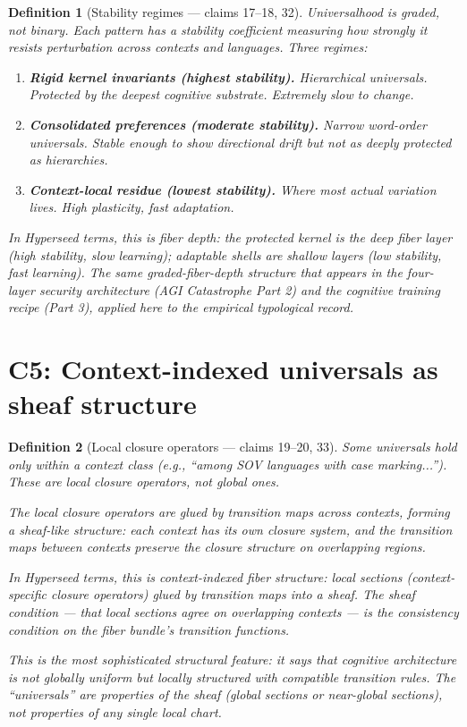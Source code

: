 \documentclass[11pt,a4paper]{article}
\newtheorem{definition}{Definition}[section]
\begin{document}
\begin{definition}[Stability regimes --- claims 17--18, 32]
\label{def:graded}
Universalhood is graded, not binary. Each pattern has a stability
coefficient measuring how strongly it resists perturbation across
contexts and languages. Three regimes:

\begin{enumerate}
\item \textbf{Rigid kernel invariants (highest stability).}
  Hierarchical universals. Protected by the deepest cognitive
  substrate. Extremely slow to change.
\item \textbf{Consolidated preferences (moderate stability).}
  Narrow word-order universals. Stable enough to show directional
  drift but not as deeply protected as hierarchies.
\item \textbf{Context-local residue (lowest stability).} Where
  most actual variation lives. High plasticity, fast adaptation.
\end{enumerate}

In Hyperseed terms, this is \emph{fiber depth}: the protected
kernel is the deep fiber layer (high stability, slow learning);
adaptable shells are shallow layers (low stability, fast learning).
The same graded-fiber-depth structure that appears in the four-layer
security architecture (AGI Catastrophe Part 2) and the cognitive
training recipe (Part 3), applied here to the empirical typological
record.
\end{definition}


\section{C5: Context-indexed universals as sheaf structure}
\label{sec:context}

\begin{definition}[Local closure operators --- claims 19--20, 33]
\label{def:context}
Some universals hold only within a context class (e.g., ``among
SOV languages with case marking...''). These are local closure
operators, not global ones.

The local closure operators are glued by transition maps across
contexts, forming a sheaf-like structure: each context has its own
closure system, and the transition maps between contexts preserve
the closure structure on overlapping regions.

In Hyperseed terms, this is \emph{context-indexed fiber structure}:
local sections (context-specific closure operators) glued by
transition maps into a sheaf. The sheaf condition --- that local
sections agree on overlapping contexts --- is the consistency
condition on the fiber bundle's transition functions.

This is the most sophisticated structural feature: it says that
cognitive architecture is not globally uniform but locally
structured with compatible transition rules. The ``universals''
are properties of the sheaf (global sections or near-global
sections), not properties of any single local chart.
\end{definition}
\end{document}

